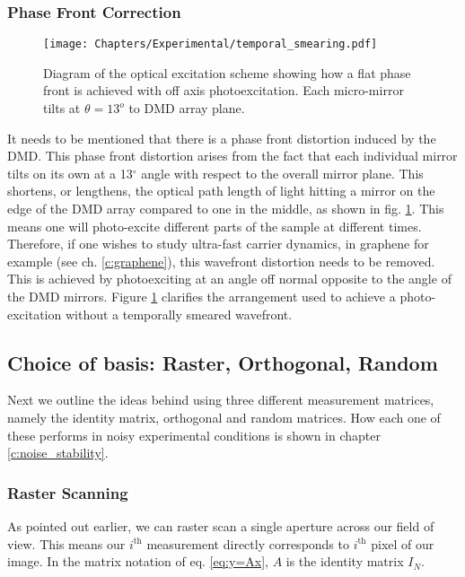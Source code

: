 \subsubsection{Phase Front Correction}\label{sec:DMD_phase}
\begin{figure}[h]\centering
\texttt{[image: Chapters/Experimental/temporal\_smearing.pdf]}
\caption{Diagram of the optical excitation scheme showing how a flat phase front is achieved with off axis photoexcitation. Each micro-mirror tilts at $\theta = 13^o$ to DMD array plane.}
\label{thzphase} 
\end{figure}
It needs to be mentioned that there is a phase front distortion induced by the DMD. This phase front distortion arises from the fact that each individual mirror tilts on its own at a 13$^{\circ}$ angle with respect to the overall mirror plane. This shortens, or lengthens, the optical path length of light hitting a mirror on the edge of the DMD array compared to one in the middle, as shown in fig. \ref{thzphase}. This means one will photo-excite different parts of the sample at different times. Therefore, if one wishes to study ultra-fast carrier dynamics, in graphene for example (see ch. \ref{c:graphene}), this wavefront distortion needs to be removed. This is achieved by photoexciting at an angle off normal opposite to the angle of the DMD mirrors. Figure \ref{thzphase} clarifies the arrangement used to achieve a photo-excitation without a temporally smeared wavefront.


\subsection{Choice of basis: Raster, Orthogonal, Random} \label{ss:masking_scheme}
Next we outline the ideas behind using three different measurement matrices, namely the identity matrix, orthogonal and random matrices. How each one of these performs in noisy experimental conditions is shown in chapter \ref{c:noise_stability}.

\subsubsection{Raster Scanning}
As pointed out earlier, we can raster scan a single aperture across our field of view. This means our $i^{\text{th}}$ measurement directly corresponds to $i^{\text{th}}$ pixel of our image. In the matrix notation of eq. \eqref{eq:y=Ax}, $A$ is the identity matrix $I_N$. 


